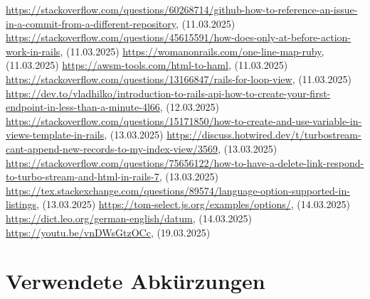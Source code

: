 \begin{thebibliography}{9}
     \url{https://stackoverflow.com/questions/60268714/github-how-to-reference-an-issue-in-a-commit-from-a-different-repository}, (11.03.2025)
     \url{https://stackoverflow.com/questions/45615591/how-does-only-at-before-action-work-in-rails}, (11.03.2025)
     \url{https://womanonrails.com/one-line-map-ruby}, (11.03.2025)
     \url{https://awsm-tools.com/html-to-haml}, (11.03.2025)
     \url{https://stackoverflow.com/questions/13166847/rails-for-loop-view}, (11.03.2025)
     \url{https://dev.to/vladhilko/introduction-to-rails-api-how-to-create-your-first-endpoint-in-less-than-a-minute-4l66}, (12.03.2025)
     \url{https://stackoverflow.com/questions/15171850/how-to-create-and-use-variable-in-views-template-in-rails}, (13.03.2025)
     \url{https://discuss.hotwired.dev/t/turbostream-cant-append-new-records-to-my-index-view/3569}, (13.03.2025)
     \url{https://stackoverflow.com/questions/75656122/how-to-have-a-delete-link-respond-to-turbo-stream-and-html-in-rails-7}, (13.03.2025)
     \url{https://tex.stackexchange.com/questions/89574/language-option-supported-in-listings}, (13.03.2025)
     \url{https://tom-select.js.org/examples/options/}, (14.03.2025)
     \url{https://dict.leo.org/german-english/datum}, (14.03.2025)
     \url{https://youtu.be/vnDWsGtzOCc}, (19.03.2025)
\end{thebibliography}

\chapter{Verwendete Abkürzungen}

